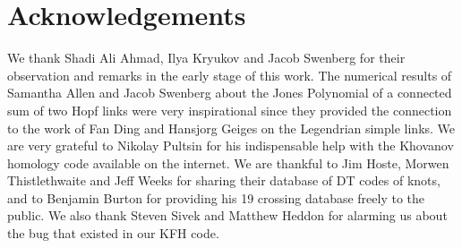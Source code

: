 \documentclass{article}
\theoremstyle{plain}
\begin{document}
    \section{Acknowledgements}
        We thank Shadi Ali Ahmad, Ilya Kryukov and Jacob Swenberg for their
        observation and remarks in the early stage of this work. The numerical
        results of Samantha Allen and Jacob Swenberg about the Jones Polynomial
        of a connected sum of two Hopf links were very inspirational since they
        provided the connection to the work of Fan Ding and Hansjorg Geiges on
        the Legendrian simple links. We are very grateful to Nikolay Pultsin
        for his indispensable help with the Khovanov homology code available
        on the internet. We are thankful to Jim Hoste, Morwen Thistlethwaite
        and Jeff Weeks for sharing their database of DT codes of knots, and
        to Benjamin Burton for providing his 19 crossing database freely to
        the public.
        We also thank Steven Sivek and Matthew Heddon
        for alarming us about the bug that
        existed in our KFH code.
    \newpage
\end{document}
